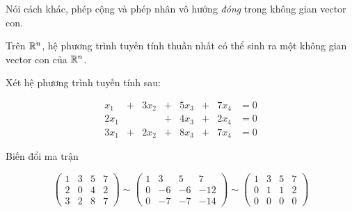 Nói cách khác, phép cộng và phép nhân vô hướng \textit{đóng} trong
không gian vector con.

\begin{remark}
    Trên $\mathbb{R}^n$, hệ phương trình tuyến tính thuần nhất có thể sinh
    ra một không gian vector con của $\mathbb{R}^n$.
\end{remark}

\begin{example}
    Xét hệ phương trình tuyến tính sau:

    \begin{equation}
        \begin{array}{cccccccc}
            x_1 & + & 3x_2 & + & 5x_3 & + & 7x_4 & = 0 \\
            2x_1 & & & + & 4x_3 & + & 2x_4 & = 0 \\
            3x_1 & + & 2x_2 & + & 8x_3 & + & 7x_4 & = 0
        \end{array}
    \end{equation}

    Biến đổi ma trận

    \[
        \begin{pmatrix}
            1 & 3 & 5 & 7 \\
            2 & 0 & 4 & 2 \\
            3 & 2 & 8 & 7
        \end{pmatrix} \sim \begin{pmatrix}
            1 & 3 & 5 & 7 \\
            0 & -6 & -6 & -12 \\
            0 & -7 & -7 & -14
        \end{pmatrix} \sim \begin{pmatrix}
            1 & 3 & 5 & 7 \\
            0 & 1 & 1 & 2 \\
            0 & 0 & 0 & 0
        \end{pmatrix}
    \]

\end{example}
